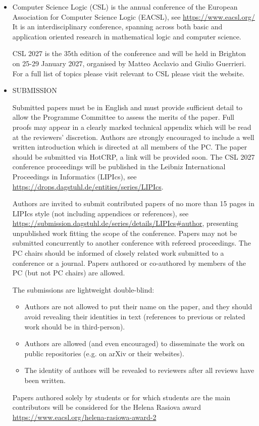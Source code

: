 \documentclass[prodmode,acmtecs]{acmsmall} %
\begin{document}
\begin{itemize}\item  Computer Science Logic (CSL) is the annual conference of the European Association for Computer Science Logic (EACSL), see \href{https://www.eacsl.org/}{https://www.eacsl.org/} It is an interdisciplinary conference, spanning across both basic and application oriented research in mathematical logic and computer science. 
 
  CSL 2027 is the 35th edition of the conference and will be held in Brighton on 25-29 January 2027, organised by Matteo Acclavio and Giulio Guerrieri. For a full list of topics please visit relevant to CSL please visit the website.  
 
\item  SUBMISSION 
 
  Submitted papers must be in English and must provide sufficient detail to allow the Programme Committee to assess the merits of the paper. Full proofs may appear in a clearly marked technical appendix which will be read at the reviewers' discretion. Authors are strongly encouraged to include a well written introduction which is directed at all members of the PC. The paper should be submitted via HotCRP, a link will be provided soon. The CSL 2027 conference proceedings will be published in the Leibniz International Proceedings in Informatics (LIPIcs), see \href{https://drops.dagstuhl.de/entities/series/LIPIcs}{https://drops.dagstuhl.de/entities/series/LIPIcs}. 
 
  Authors are invited to submit contributed papers of no more than 15 pages in LIPIcs style (not including appendices or references), see \href{https://submission.dagstuhl.de/series/details/LIPIcs#author}{https://submission.dagstuhl.de/series/details/LIPIcs\#author}, presenting unpublished work fitting the scope of the conference. Papers may not be submitted concurrently to another conference with refereed proceedings. The PC chairs should be informed of closely related work submitted to a conference or a journal. Papers authored or co-authored by members of the PC (but not PC chairs) are allowed. 
 
  The submissions are lightweight double-blind:  
 
\begin{itemize}\item  Authors are not allowed to put their name on the paper, and they should avoid revealing their identities in text (references to previous or related work should be in third-person). 
\item  Authors are allowed (and even encouraged) to disseminate the work on public repositories (e.g. on arXiv or their websites).
\item  The identity of authors will be revealed to reviewers after all reviews have been written. 
\end{itemize} 
  Papers authored solely by students or for which students are the main contributors will be considered for the Helena Rasiova award \href{https://www.eacsl.org/helena-rasiowa-award-2}{https://www.eacsl.org/helena-rasiowa-award-2} 
 

\end{itemize}
\end{document}
